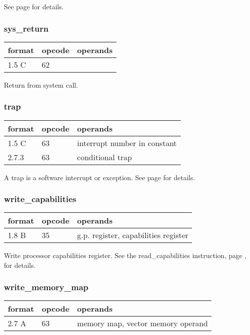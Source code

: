 \documentclass[forwardcom.tex]{subfiles}
\begin{document}
See page \pageref{systemCallInstruction} for details.
\vspace{2mm}

\subsubsection{sys\_return}
\label{table:sysCallInstruction}
\begin{tabular}{|p{12mm}|p{12mm}|p{110mm}|}
\hline
\bfseries format & \bfseries opcode & \bfseries operands \\ \hline
1.5 C & 62 & \\ \hline
\end{tabular}
\vspace{2mm}

Return from system call.

\subsubsection{trap}
\label{table:trapInstruction}
\begin{tabular}{|p{12mm}|p{12mm}|p{110mm}|}
\hline
\bfseries format & \bfseries opcode & \bfseries operands \\ \hline
1.5 C & 63 & interrupt number in constant \\ \hline
2.7.3 & 63 & conditional trap \\ \hline
\end{tabular}
\vspace{2mm}

A trap is a software interrupt or exception. See page \pageref{traps} for details.

\subsubsection{write\_capabilities}
\label{table:writeCapabilitiesInstruction}
\begin{tabular}{|p{12mm}|p{12mm}|p{110mm}|}
\hline
\bfseries format & \bfseries opcode & \bfseries operands \\ \hline
1.8 B & 35 & g.p. register, capabilities register \\ \hline
\end{tabular}
\vspace{2mm}

Write processor capabilities register. See the read\_capabilities instruction, page \pageref{table:readCapabilitiesInstruction}, for details.

\subsubsection{write\_memory\_map}
\label{table:writeMemoryMapInstruction}\begin{tabular}{|p{12mm}|p{12mm}|p{110mm}|}
\hline
\bfseries format & \bfseries opcode & \bfseries operands \\ \hline
2.7 A & 63 & memory map, vector memory operand \\ \hline
\end{tabular}
\vspace{2mm}
\end{document}
